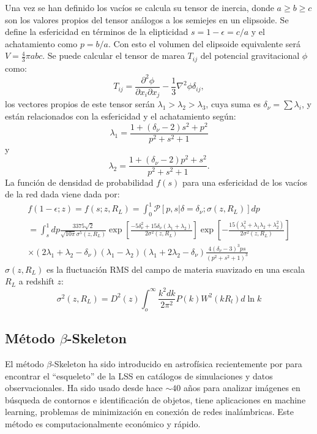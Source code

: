 \documentclass[preprint]{aastex62}
\begin{document}
  Una vez se han definido los vacíos se calcula su tensor de inercia, donde $a \geq b \geq c$ son los
  valores propios del tensor análogos a los semiejes en un elipsoide. Se define la esfericidad en
  términos de la elipticidad $s = 1 - \epsilon = c / a$ y el achatamiento como $ p = b / a$. Con esto
  el volumen del elipsoide equivalente será $V = \frac{4}{3}\pi abc$. Se puede calcular el tensor de
  marea $T_{ij}$ del potencial gravitacional $\phi$ como:
  \begin{equation}
    T_{ij} = \frac{\partial^2 \phi}{\partial x_i \partial x_j} - \frac{1}{3} \nabla^2 \phi \delta_{ij},
  \end{equation}
  los vectores propios de este tensor serán  $\lambda_1 > \lambda_2 > \lambda_3$, cuya suma es
  $\delta_\nu = \sum \lambda_i$, y están relacionados con la esfericidad y el achatamiento según:
  \begin{equation}
    \lambda_1 = \frac{1 + (\delta_\nu -2)s^2 + p^2}{p^2 + s^2 + 1}
 \end{equation}
  y  
  \begin{equation}
    \lambda_2 = \frac{1 + (\delta_\nu -2)p^2 + s^2}{p^2 + s^2 + 1}.
  \end{equation}
  La función de densidad de probabilidad $f(s)$ para una esfericidad de los vacíos de la red dada viene dada por:
  \begin{eqnarray}
    f(1-\epsilon;z) = f(s;z, R_L) = \int_0^1 \mathcal{P}\left[ p,s|\delta = \delta_\nu;\sigma(z,R_L)\right] dp \nonumber\\
    = \int_s^1 dp \frac{3375 \sqrt{2}}{ \sqrt{10 \pi} \sigma^5(z,R_L)}
      \exp \left[ \frac{-5 \delta_\nu^2 + 15 \delta_\nu ( \lambda_1 + \lambda_2 )}{2 \sigma^2(z,R_L)} \right] 
      \exp \left[ - \frac{ 15(\lambda_1^2 + \lambda_1 \lambda_2 + \lambda_2^2)}{ 2\sigma^2(z,R_L)}\right] \\
      \times (2\lambda_1 + \lambda_2 - \delta_\nu) 
       (\lambda_1 - \lambda_2)( \lambda_1 + 2\lambda_2 - \delta_\nu) \frac{ 4 (\delta_\nu - 3)^3 p s }{ ( p^2 + s^2 + 1)^3}
  \end{eqnarray}
  $\sigma(z,R_L)$ es la fluctuación RMS del campo de materia suavizado en una escala $R_L$ a
  redshift $z$:
  \begin{equation}
    \sigma^2(z,R_L) = D^2(z) \int_o^{\infty} \frac{k^2dk}{2\pi^2}P(k) W^2(kR_l)d \ln k
  \end{equation}
  \subsection{Método $\beta$-Skeleton}
  El método $\beta$-Skeleton ha sido introducido en astrofísica recientemente por \citet{Fang2018} para
  encontrar el ``esqueleto'' de la  LSS en catálogos de simulaciones y datos observacionales.
  Ha sido usado desde hace $\sim 40$ años para analizar imágenes en búsqueda de contornos e identificación
  de objetos, tiene aplicaciones en machine learning, problemas de minimización en conexión de redes
  inalámbricas. Este método es computacionalmente económico y rápido.
  
\end{document}
